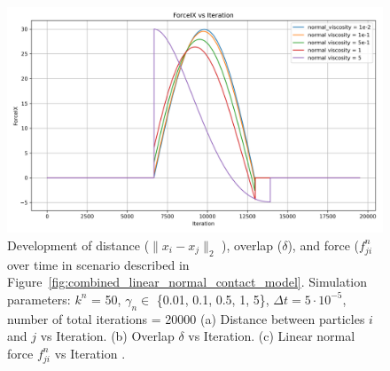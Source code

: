 \documentclass[11pt,
               a4paper,
               bibtotoc,
               idxtotoc,
               headsepline,
               footsepline,
               footexclude,
               BCOR12mm,
               DIV13,
               openany,   %
               ]
               {scrbook}
\begin{document}
\begin{figure}[H]
	\begin{minipage}[t]{0.6\textwidth}
		\centering
		\includegraphics[width=\textwidth]{figures/contactForceLaws/linearNormalContactModel/ForceIX vs Iterationsimple_collision_two_particles_statistics_stiffness_50_viscosity_1e-2.png}
	\end{minipage}
	
	\caption[Combined Caption]{Development of distance ($\lVert x_i - x_j \rVert_2$ ), overlap ($\delta$), and force ($f^n_{ji}$ over time in scenario described in Figure~\ref{fig:combined_linear_normal_contact_model}. Simulation parameters: $k^n$ = 50, $\gamma_n \in $ \{0.01, 0.1, 0.5, 1, 5\}, $\Delta t = 5 \cdot 10^{-5}$, number of total iterations = 20000 (a) Distance between particles $i$ and $j$ vs Iteration. (b) Overlap $\delta$ vs Iteration. (c) Linear normal force $f^n_{ji}$ vs Iteration .}
	\label{fig:Distance_Overlap_Force_plots}
\end{figure}
\end{document}
